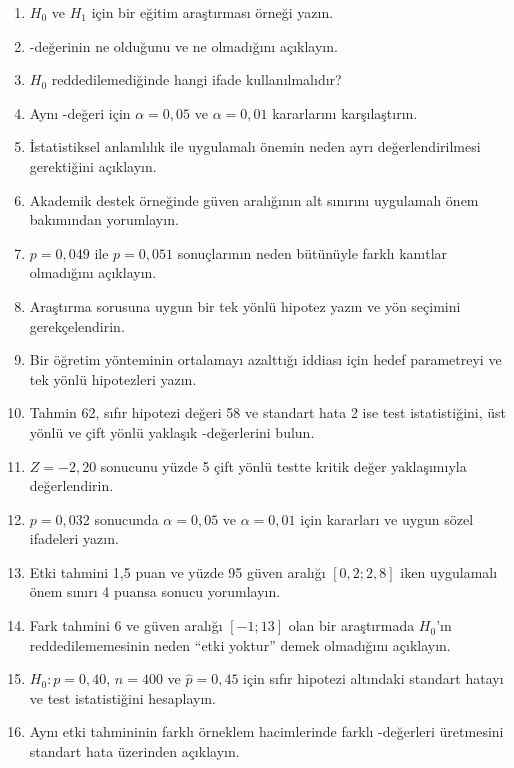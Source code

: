 \begin{enumerate}
  \item $H_0$ ve $H_1$ için bir eğitim araştırması örneği yazın.
  \item \pval-değerinin ne olduğunu ve ne olmadığını açıklayın.
  \item $H_0$ reddedilemediğinde hangi ifade kullanılmalıdır?
  \item Aynı \pval-değeri için $\alpha=0{,}05$ ve $\alpha=0{,}01$ kararlarını karşılaştırın.
  \item İstatistiksel anlamlılık ile uygulamalı önemin neden ayrı değerlendirilmesi gerektiğini açıklayın.
  \item Akademik destek örneğinde güven aralığının alt sınırını uygulamalı önem bakımından yorumlayın.
  \item $p=0{,}049$ ile $p=0{,}051$ sonuçlarının neden bütünüyle farklı kanıtlar olmadığını açıklayın.
  \item Araştırma sorusuna uygun bir tek yönlü hipotez yazın ve yön seçimini gerekçelendirin.
  \item Bir öğretim yönteminin ortalamayı azalttığı iddiası için hedef
  parametreyi ve tek yönlü hipotezleri yazın.
  \item Tahmin 62, sıfır hipotezi değeri 58 ve standart hata 2 ise test
  istatistiğini, üst yönlü ve çift yönlü yaklaşık \pval-değerlerini bulun.
  \item $Z=-2{,}20$ sonucunu yüzde 5 çift yönlü testte kritik değer
  yaklaşımıyla değerlendirin.
  \item $p=0{,}032$ sonucunda $\alpha=0{,}05$ ve $\alpha=0{,}01$ için
  kararları ve uygun sözel ifadeleri yazın.
  \item Etki tahmini 1,5 puan ve yüzde 95 güven aralığı $[0{,}2;2{,}8]$ iken
  uygulamalı önem sınırı 4 puansa sonucu yorumlayın.
  \item Fark tahmini 6 ve güven aralığı $[-1;13]$ olan bir araştırmada
  $H_0$'ın reddedilememesinin neden ``etki yoktur'' demek olmadığını açıklayın.
  \item $H_0:p=0{,}40$, $n=400$ ve $\hat p=0{,}45$ için sıfır hipotezi
  altındaki standart hatayı ve test istatistiğini hesaplayın.
  \item Aynı etki tahmininin farklı örneklem hacimlerinde farklı \pval-değerleri
  üretmesini standart hata üzerinden açıklayın.
\end{enumerate}